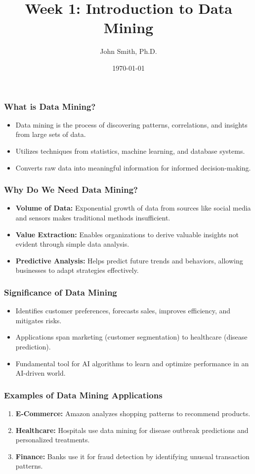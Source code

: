 \documentclass[aspectratio=169]{beamer}
\title[Data Mining Introduction]{Week 1: Introduction to Data Mining}
\author[J. Smith]{John Smith, Ph.D.}
\institute[University Name]{
  Department of Computer Science\\
  University Name\\
  \vspace{0.3cm}
  Email: email@university.edu\\
  Website: www.university.edu
}
\date{\today}
\begin{document}
\frame{\titlepage}

\begin{frame}[fragile]
    \titlepage
\end{frame}

\begin{frame}[fragile]
    \frametitle{What is Data Mining?}
    \begin{itemize}
        \item Data mining is the process of discovering patterns, correlations, and insights from large sets of data.
        \item Utilizes techniques from statistics, machine learning, and database systems.
        \item Converts raw data into meaningful information for informed decision-making.
    \end{itemize}
\end{frame}

\begin{frame}[fragile]
    \frametitle{Why Do We Need Data Mining?}
    \begin{itemize}
        \item \textbf{Volume of Data:} Exponential growth of data from sources like social media and sensors makes traditional methods insufficient.
        \item \textbf{Value Extraction:} Enables organizations to derive valuable insights not evident through simple data analysis.
        \item \textbf{Predictive Analysis:} Helps predict future trends and behaviors, allowing businesses to adapt strategies effectively.
    \end{itemize}
\end{frame}

\begin{frame}[fragile]
    \frametitle{Significance of Data Mining}
    \begin{itemize}
        \item Identifies customer preferences, forecasts sales, improves efficiency, and mitigates risks.
        \item Applications span marketing (customer segmentation) to healthcare (disease prediction).
        \item Fundamental tool for AI algorithms to learn and optimize performance in an AI-driven world.
    \end{itemize}
\end{frame}

\begin{frame}[fragile]
    \frametitle{Examples of Data Mining Applications}
    \begin{enumerate}
        \item \textbf{E-Commerce:} Amazon analyzes shopping patterns to recommend products.
        \item \textbf{Healthcare:} Hospitals use data mining for disease outbreak predictions and personalized treatments.
        \item \textbf{Finance:} Banks use it for fraud detection by identifying unusual transaction patterns.
    \end{enumerate}
\end{frame}
\end{document}

